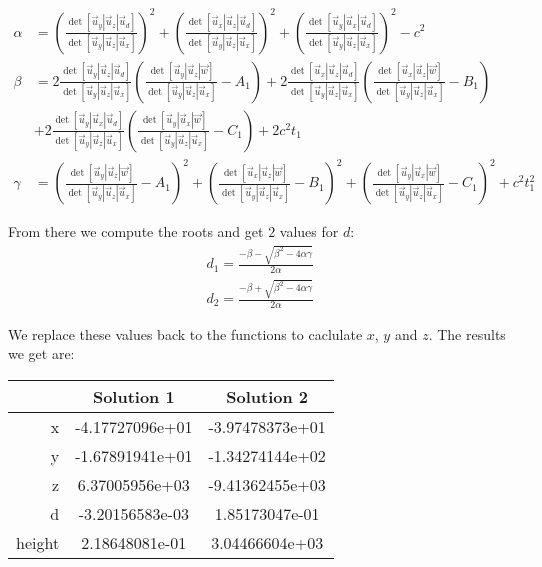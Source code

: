 \documentclass[a4paper]{article}
\begin{document}
\begin{align}
\alpha &= (\frac{\det[\vec{u}_y | \vec{u}_z | \vec{u}_d]}{\det[\vec{u}_y | \vec{u}_z | \vec{u}_x]})^2 + (\frac{\det[\vec{u}_x | \vec{u}_z | \vec{u}_d]}{\det[\vec{u}_y | \vec{u}_z | \vec{u}_x]})^2 + (\frac{\det[\vec{u}_y | \vec{u}_x | \vec{u}_d]}{\det[\vec{u}_y | \vec{u}_z | \vec{u}_x]})^2 - c^2 \nonumber \\
\beta &= 2\frac{\det[\vec{u}_y | \vec{u}_z | \vec{u}_d]}{\det[\vec{u}_y | \vec{u}_z | \vec{u}_x]}(\frac{\det[\vec{u}_y | \vec{u}_z | \vec{w}]}{\det[\vec{u}_y | \vec{u}_z | \vec{u}_x]} - A_1) + 2\frac{\det[\vec{u}_x | \vec{u}_z | \vec{u}_d]}{\det[\vec{u}_y | \vec{u}_z | \vec{u}_x]}(\frac{\det[\vec{u}_x | \vec{u}_z | \vec{w}]}{\det[\vec{u}_y | \vec{u}_z | \vec{u}_x]} - B_1) \nonumber\\
&+ 2\frac{\det[\vec{u}_y | \vec{u}_x | \vec{u}_d]}{\det[\vec{u}_y | \vec{u}_z | \vec{u}_x]}(\frac{\det[\vec{u}_y | \vec{u}_x | \vec{w}]}{\det[\vec{u}_y | \vec{u}_z | \vec{u}_x]} - C_1) + 2c^2t_1 \nonumber\\
\gamma &= (\frac{\det[\vec{u}_y | \vec{u}_z | \vec{w}]}{\det[\vec{u}_y | \vec{u}_z | \vec{u}_x]} - A_1)^2 + (\frac{\det[\vec{u}_x | \vec{u}_z | \vec{w}]}{\det[\vec{u}_y | \vec{u}_z | \vec{u}_x]} - B_1)^2 + (\frac{\det[\vec{u}_y | \vec{u}_x | \vec{w}]}{\det[\vec{u}_y | \vec{u}_z | \vec{u}_x]} - C_1)^2 + c^2t_1^2 \nonumber
\end{align}

From there we compute the roots and get $2$ values for $d$:
\begin{align}
d_1 = \frac{-\beta - \sqrt{\beta^2 - 4\alpha\gamma}}{2\alpha}\nonumber\\
d_2 = \frac{-\beta + \sqrt{\beta^2 - 4\alpha\gamma}}{2\alpha}\nonumber
\end{align}

We replace these values back to the functions to caclulate $x$, $y$ and $z$. The results we get are:
\begin{center}
\begin{tabular}{r | c | c}
	& Solution 1 & Solution 2\\ \hline
	x & -4.17727096e+01 & -3.97478373e+01\\ \hline
	y & -1.67891941e+01 & -1.34274144e+02\\ \hline
	z & 6.37005956e+03 & -9.41362455e+03\\ \hline
	d & -3.20156583e-03 & 1.85173047e-01\\ \hline
	height & 2.18648081e-01 & 3.04466604e+03
\end{tabular} 
\end{center}
\end{document}
